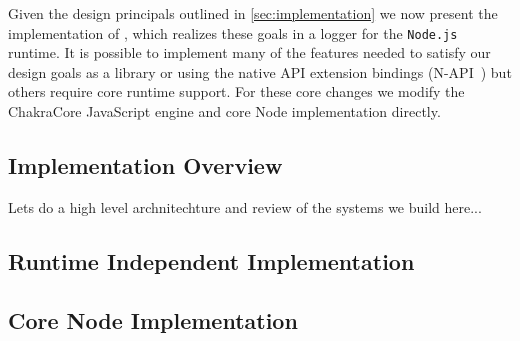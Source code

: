 Given the design principals outlined in \autoref{sec:implementation} we now 
present the implementation of \projn, which realizes these goals in a logger 
for the \texttt{Node.js}~\cite{Node} runtime. It is possible to implement many 
of the features needed to satisfy our design goals as a library or using the 
native API extension bindings (N-API~\cite{NAPI}) but others require core 
runtime support. For these core changes we modify the ChakraCore JavaScript 
engine and core Node implementation directly.

\subsection{Implementation Overview}
Lets do a high level archnitechture and review of the systems we build here...

\subsection{Runtime Independent Implementation}

\subsection{Core Node Implementation}
